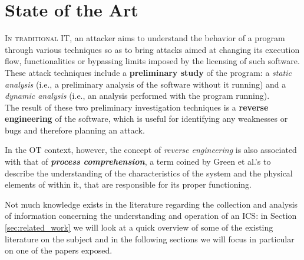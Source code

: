 \chapter{State of the Art}
\label{state_of_art}
\linenumbers

\lettrine[lines=2]{I}{n traditional IT}, an attacker aims to understand the behavior of a program through various techniques so as to bring attacks aimed at changing its execution flow, functionalities or bypassing limits imposed by the licensing of such software. These attack techniques include a \textbf{preliminary study} of the program: a \textit{static analysis} (i.e., a preliminary analysis of the software without it running) and a \textit{dynamic analysis} (i.e., an analysis performed with the program running).\\
The result of these two preliminary investigation techniques is a \textbf{reverse engineering} of the software, which is useful for identifying any weaknesses or bugs and therefore planning an attack.

\bigskip
In the OT context, however, the concept of \textit{reverse engineering} is also associated with that of \textit{\textbf{process comprehension}}, a term coined by Green et al.'s \cite{green_et_al} to describe the understanding of the characteristics of the system and the physical elements of within it, that are responsible for its proper functioning.

\bigskip
Not much knowledge exists in the literature regarding the collection and analysis of information concerning the understanding and operation of an ICS: in Section \ref{sec:related_work} we will look at a quick overview of some of the existing literature on the subject and in the following sections we will focus in particular on one of the papers exposed.

\vfill

